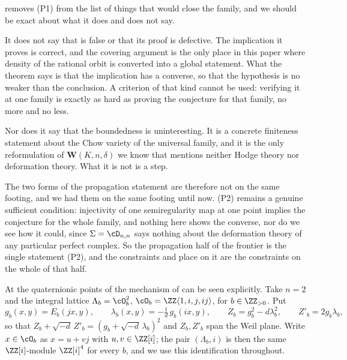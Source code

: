 \begin{remark}\label{rem:p1collapse}
 removes (P1) from the list of things that would close
the family, and we should be exact about what it does and does not say.

It does not say that  is false or that its proof is
defective. The implication it proves is correct, and the covering argument is
the only place in this paper where density of the rational orbit is converted
into a global statement. What the theorem says is that the implication has a
converse, so that the hypothesis is no weaker than the conclusion. A criterion
of that kind cannot be used: verifying it at one family is exactly as hard as
proving the conjecture for that family, no more and no less.

Nor does it say that the boundedness is uninteresting. It is a concrete
finiteness statement about the Chow variety of the universal family, and it is
the only reformulation of $\mathbf{W}(K,n,\delta)$ we know that mentions
neither Hodge theory nor deformation theory. What it is not is a step.

The two forms of the propagation statement are therefore not on the same
footing, and we had them on the same footing until now. (P2) remains a genuine
sufficient condition: injectivity of one semiregularity map at one point
implies the conjecture for the whole family, and nothing here shows the
converse, nor do we see how it could, since $\Sigma=\cD_{n,n}$ says nothing
about the deformation theory of any particular perfect complex. So the
propagation half of the frontier is the single statement (P2), and the
constraints  and  place on it are the
constraints on the whole of that half.
\end{remark}

At the quaternionic points of  the mechanism of
 can be seen explicitly. Take $n=2$ and the integral
lattice
$\Lambda_{b}=\cO_{b}^{2}$, $\cO_{b}=\ZZ\langle 1,i,j,ij\rangle$, for
$b\in\ZZ_{>0}$. Put
\[
  g_{b}(x,y)=E_{b}(jx,y),\qquad
  \lambda_{b}(x,y)=-\tfrac{1}{d}\,g_{b}(ix,y),\qquad
  Z_{b}=g_{b}^{2}-d\lambda_{b}^{2},\qquad Z'_{b}=2g_{b}\lambda_{b},
\]
so that $Z_{b}+\sqrt{-d}\,Z'_{b}=(g_{b}+\sqrt{-d}\,\lambda_{b})^{2}$ and
$Z_{b},Z'_{b}$ span the Weil plane. Write $x\in\cO_{b}$ as $x=u+vj$ with
$u,v\in\ZZ[i]$; the pair $(\Lambda_{b},i)$ is then the same $\ZZ[i]$-module
$\ZZ[i]^{4}$ for every $b$, and we use this identification throughout.

